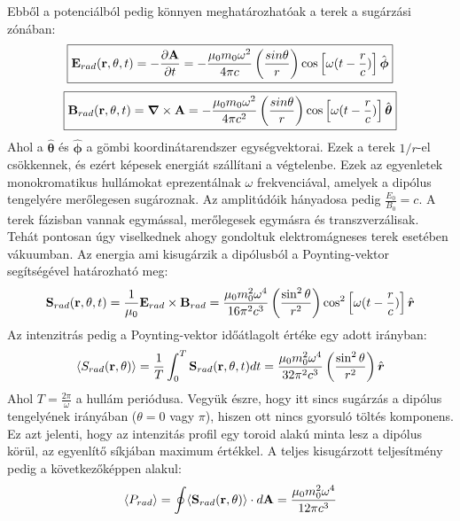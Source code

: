 \documentclass[../main.tex]{subfiles}
\begin{document}
Ebből a potenciálból pedig könnyen meghatározhatóak a terek a sugárzási zónában:
\begin{equation}
    \boxed{\bold{E}_{rad}(\bold{r}, \theta, t) = - \frac{\partial \bold{A}}{\partial t} = - \frac{\mu_0 m_0 \omega^2}{4 \pi c} \left(\frac{sin \theta}{r}\right) \cos \left[\omega (t - \frac{r}{c})\right] \hat{\boldsymbol{\phi}}}
\end{equation}
\begin{equation}
    \boxed{\bold{B}_{rad}(\bold{r}, \theta, t) = \boldsymbol{\nabla} \times \bold{A} = - \frac{\mu_0 m_0 \omega^2}{4 \pi c^2} \left(\frac{sin \theta}{r}\right) \cos \left[\omega (t - \frac{r}{c})\right] \hat{\boldsymbol{\theta}}}
\end{equation}
Ahol a $\hat{\boldsymbol{\theta}}$ és $\hat{\boldsymbol{\phi}}$ a gömbi koordinátarendszer egységvektorai. Ezek a terek $1/r$-el csökkennek, és ezért képesek energiát szállítani a végtelenbe.
Ezek az egyenletek monokromatikus hullámokat eprezentálnak $\omega$ frekvenciával, amelyek a dipólus tengelyére merőlegesen sugároznak. Az amplitúdóik hányadosa pedig $\frac{E_0}{B_0} = c$.
A terek fázisban vannak egymással, merőlegesek egymásra és transzverzálisak. Tehát pontosan úgy viselkednek ahogy gondoltuk elektromágneses terek esetében vákuumban. Az energia ami kisugárzik a dipólusból a Poynting-vektor segítségével határozható meg:
\begin{equation}
    \bold{S}_{rad}(\bold{r}, \theta, t) = \frac{1}{\mu_0} \bold{E}_{rad} \times \bold{B}_{rad} = \frac{\mu_0 m_0^2 \omega^4}{16 \pi^2 c^3} \left(\frac{\sin^2 \theta}{r^2}\right) \cos^2 \left[\omega (t - \frac{r}{c})\right] \hat{\boldsymbol{r}}
\end{equation}
Az intenzitrás pedig a Poynting-vektor időátlagolt értéke egy adott irányban:
\begin{equation}
    \langle S_{rad}(\bold{r}, \theta) \rangle = \frac{1}{T} \int_0^T \bold{S}_{rad}(\bold{r}, \theta, t) dt = \frac{\mu_0 m_0^2 \omega^4}{32 \pi^2 c^3} \left(\frac{\sin^2 \theta}{r^2}\right) \hat{\boldsymbol{r}}
\end{equation}
Ahol $T = \frac{2 \pi}{\omega}$ a hullám periódusa. Vegyük észre, hogy itt sincs sugárzás a dipólus tengelyének irányában ($\theta = 0$ vagy $\pi$), hiszen ott nincs gyorsuló töltés komponens.
Ez azt jelenti, hogy az intenzitás profil egy toroid alakú minta lesz a dipólus körül, az egyenlítő síkjában maximum értékkel.
A teljes kisugárzott teljesítmény pedig a következőképpen alakul:
\begin{equation}
    \langle P_{rad} \rangle = \oint \langle \bold{S}_{rad}(\bold{r}, \theta) \rangle \cdot d\bold{A} = \frac{\mu_0 m_0^2 \omega^4}{12 \pi c^3}
\end{equation}
\end{document}
